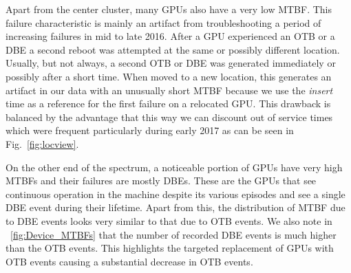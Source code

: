 Apart from the center cluster, many GPUs also have a very 
low MTBF. This failure characteristic is mainly an artifact from
troubleshooting a period of increasing failures in mid to late 2016.
After a GPU experienced an OTB or a DBE a second reboot was attempted at
the same or possibly different location. Usually, but not always, a
second OTB or DBE was generated immediately or possibly after a short
time. When moved to a new location, this generates an artifact in our
data with an unusually short MTBF because we use the {\em insert} time as
a reference for the first failure on a relocated GPU. This drawback is
balanced by the advantage that this way we can discount out of service times
which were frequent particularly during early 2017 as can be seen in
Fig.~\ref{fig:locview}.

On the other end of the spectrum, a noticeable portion of GPUs have very high
MTBFs and their failures are mostly DBEs. These are the GPUs that see continuous operation in the machine 
despite its various episodes and see a single DBE event during their lifetime.
Apart from this, the distribution of MTBF due to DBE events looks very similar to that due 
to OTB events. We also note in ~\ref{fig:Device_MTBFs} that the number of recorded 
DBE events is much higher than the OTB events. This highlights the targeted replacement of GPUs 
with OTB events causing a substantial decrease in OTB events.  




